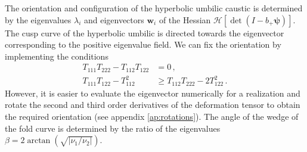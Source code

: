 \documentclass[a4paper, 11pt]{article}
\begin{document}
The orientation and configuration of the hyperbolic umbilic caustic is determined by the eigenvalues $\lambda_i$ and eigenvectors $\bm{w}_i$ of the Hessian $\mathcal{H}\left[\det (I- b_+ \bm{\psi})\right]$. The cusp curve of the hyperbolic umbilic is directed towards the eigenvector corresponding to the positive eigenvalue field. We can fix the orientation by implementing the conditions
\begin{align}
T_{111}T_{222}-T_{112}T_{122}&=0\,,\\
T_{111}T_{122} -T_{112}^2 &\geq T_{112}T_{222}-2T_{122}^2\,.
\end{align}
However, it is easier to evaluate the eigenvector numerically for a realization and rotate the second and third order derivatives of the deformation tensor to obtain the required orientation (see appendix \ref{ap:rotations}). The angle of the wedge of the fold curve is determined by the ratio of the eigenvalues $\beta = 2 \arctan(\sqrt{|\nu_1/\nu_2|})$.
\end{document}
